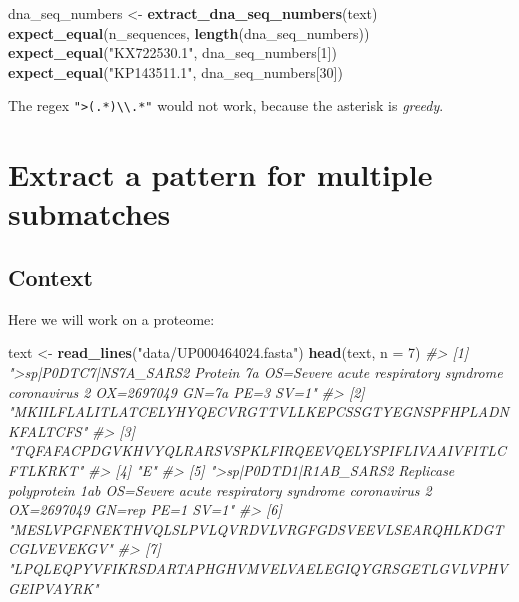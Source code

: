 \documentclass[]{book}
\newenvironment{Shaded}{}{}
\newcommand{\CommentTok}[1]{\textcolor[rgb]{0.38,0.63,0.69}{\textit{#1}}}
\newcommand{\DataTypeTok}[1]{\textcolor[rgb]{0.56,0.13,0.00}{#1}}
\newcommand{\DecValTok}[1]{\textcolor[rgb]{0.25,0.63,0.44}{#1}}
\newcommand{\KeywordTok}[1]{\textcolor[rgb]{0.00,0.44,0.13}{\textbf{#1}}}
\newcommand{\NormalTok}[1]{#1}
\newcommand{\StringTok}[1]{\textcolor[rgb]{0.25,0.44,0.63}{#1}}
\begin{document}
\begin{Shaded}
\begin{Highlighting}[]
\NormalTok{dna_seq_numbers <-}\StringTok{ }\KeywordTok{extract_dna_seq_numbers}\NormalTok{(text)}
\KeywordTok{expect_equal}\NormalTok{(n_sequences, }\KeywordTok{length}\NormalTok{(dna_seq_numbers))}
\KeywordTok{expect_equal}\NormalTok{(}\StringTok{"KX722530.1"}\NormalTok{, dna_seq_numbers[}\DecValTok{1}\NormalTok{])}
\KeywordTok{expect_equal}\NormalTok{(}\StringTok{"KP143511.1"}\NormalTok{, dna_seq_numbers[}\DecValTok{30}\NormalTok{])}
\end{Highlighting}
\end{Shaded}

The regex \texttt{"\textgreater{}(.*)\textbackslash{}\textbackslash{}\textbar{}.*"} would not work, because the asterisk is \emph{greedy}.

\hypertarget{extract-a-pattern-for-multiple-submatches}{%
\section{Extract a pattern for multiple submatches}\label{extract-a-pattern-for-multiple-submatches}}

\hypertarget{context-1}{%
\subsection{Context}\label{context-1}}

Here we will work on a proteome:

\begin{Shaded}
\begin{Highlighting}[]
\NormalTok{text <-}\StringTok{ }\KeywordTok{read_lines}\NormalTok{(}\StringTok{"data/UP000464024.fasta"}\NormalTok{)}
\KeywordTok{head}\NormalTok{(text, }\DataTypeTok{n =} \DecValTok{7}\NormalTok{)}
\CommentTok{#> [1] ">sp|P0DTC7|NS7A_SARS2 Protein 7a OS=Severe acute respiratory syndrome coronavirus 2 OX=2697049 GN=7a PE=3 SV=1"                }
\CommentTok{#> [2] "MKIILFLALITLATCELYHYQECVRGTTVLLKEPCSSGTYEGNSPFHPLADNKFALTCFS"                                                                  }
\CommentTok{#> [3] "TQFAFACPDGVKHVYQLRARSVSPKLFIRQEEVQELYSPIFLIVAAIVFITLCFTLKRKT"                                                                  }
\CommentTok{#> [4] "E"                                                                                                                             }
\CommentTok{#> [5] ">sp|P0DTD1|R1AB_SARS2 Replicase polyprotein 1ab OS=Severe acute respiratory syndrome coronavirus 2 OX=2697049 GN=rep PE=1 SV=1"}
\CommentTok{#> [6] "MESLVPGFNEKTHVQLSLPVLQVRDVLVRGFGDSVEEVLSEARQHLKDGTCGLVEVEKGV"                                                                  }
\CommentTok{#> [7] "LPQLEQPYVFIKRSDARTAPHGHVMVELVAELEGIQYGRSGETLGVLVPHVGEIPVAYRK"}
\end{Highlighting}
\end{Shaded}
\end{document}
